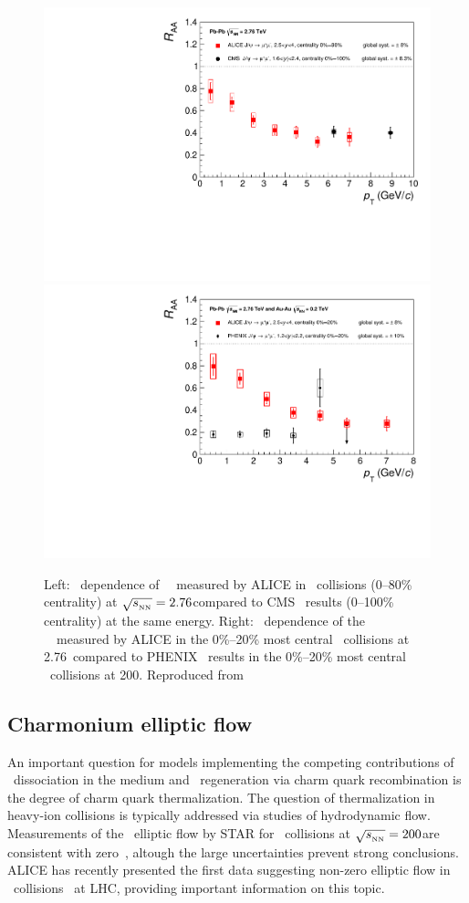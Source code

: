 \begin{figure}[h!]
\begin{center}
\includegraphics[width=0.49\linewidth,keepaspectratio]{qqbarfigures/RAAPtvsModels1.pdf}
\includegraphics[width=0.49\linewidth,keepaspectratio]{qqbarfigures/RAAPtvsModels2.pdf}
\caption{ \label{fig:GR:raaexp2}
Left: \pT\ dependence of \jpsi\ \Raa\ measured by ALICE in \PbPb\
collisions (0--80\% centrality) at $\sqrt{s_{_{\rm NN}}} = 2.76$\TeV compared to CMS~\cite{Chatrchyan:2012np}
results (0--100\% centrality) at the same energy.
Right: \pT\ dependence of the \jpsi\ \Raa\ measured by ALICE in the 0\%--20\% most
central \PbPb\ collisions at 2.76\TeV\ compared to PHENIX~\cite{Adare:2011yf}
results in the 0\%--20\% most central \AuAu\ collisions at 200\GeV. Reproduced from~\cite{Abelev:2013ila}}
\end{center}
\end{figure}


\subsection{Charmonium elliptic flow}

An important question for models implementing the competing contributions of
\jpsi\ dissociation in the medium and \jpsi\ regeneration via charm quark recombination is
the degree of charm quark thermalization. The question of thermalization in heavy-ion 
collisions is typically addressed
via studies of hydrodynamic flow. 
Measurements of the \jpsi\ elliptic flow by STAR for \AuAu\ collisions at 
$\sqrt{s_{_{\rm NN}}} = 200$\GeV are consistent with zero~\cite{Adamczyk:2012pw}, 
altough the large uncertainties prevent strong conclusions.
ALICE has recently presented the first data 
suggesting non-zero elliptic flow in \PbPb\ collisions~\cite{ALICE:2013xna} at LHC, 
providing important information on this topic.

